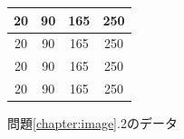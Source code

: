 \begin{figure}[h]
\begin{center}
\begin{tabular}{|c|c|c|c|}
\hline
20 & 90 & 165 & 250 \\
\hline 
20 & 90 & 165 & 250 \\
\hline
20 & 90 & 165 & 250 \\
\hline
20 & 90 & 165 & 250 \\
\hline 
\end{tabular}
\end{center}
\caption{問題\ref{chapter:image}.2のデータ}
\label{fig:ima-d}
\end{figure}





